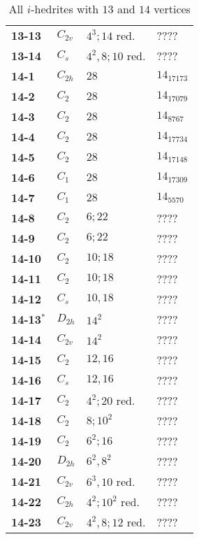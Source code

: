 \documentclass[12pt]{article}
\begin{document}
\begin{table}
\begin{center}
{\begin{minipage}[t]{7cm}
\begin{tabular}{||l|l|l|l||}
{\bf 13-13}	&$C_{2v}$	&$4^3; 14$ red.	&????\\
{\bf 13-14}	&$C_s$	&$4^2,8;10$ red.	&????\\\hline
{\bf 14-1} 	&$C_{2h}$	&$28$		&$14_{17173}$\\
{\bf 14-2}	&$C_{2}$	&$28$		&$14_{17079}$\\
{\bf 14-3}	&$C_2$	&$28$		&$14_{8767}$\\
{\bf 14-4} 	&$C_2$	&$28$		&$14_{17734}$\\
{\bf 14-5} 	&$C_2$	&$28$		&$14_{17148}$\\
{\bf 14-6} 	&$C_1$	&$28$		&$14_{17309}$\\
{\bf 14-7} 	&$C_1$	&$28$		&$14_{5570}$\\
{\bf 14-8}	&$C_{2}$	&$6; 22$		&????\\
{\bf 14-9} 	&$C_2$	&$6; 22$		&????\\
{\bf 14-10}	&$C_2$	&$10; 18$		&????\\
{\bf 14-11}	&$C_2$	&$10; 18$		&????\\
{\bf 14-12}	&$C_s$	&$10, 18$		&????\\
{\bf 14-13${}^{*}$}	&$D_{2h}$	&$14^2$		&????\\
{\bf 14-14}	&$C_{2v}$	&$14^2$		&????\\
{\bf 14-15}	&$C_2$	&$12, 16$		&????\\
{\bf 14-16}	&$C_{s}$	&$12, 16$		&????\\
{\bf 14-17}	&$C_2$	&$4^2; 20$ red.	&????\\
{\bf 14-18}	&$C_2$	&$8; 10^2$	&????\\
{\bf 14-19}	&$C_2$	&$6^2; 16$	&????\\
{\bf 14-20}	&$D_{2h}$	&$6^2, 8^2$	&????\\
{\bf 14-21}	&$C_{2v}$	&$6^3, 10$ red.	&????\\
{\bf 14-22}	&$C_{2h}$	&$4^2; 10^2$ red.	&????\\
{\bf 14-23}	&$C_{2v}$	&$4^2, 8; 12$ red.	&????\\\hline
\end{tabular}
\end{minipage}
}
\end{center}
\caption{All $i$-hedrites with $13$ and $14$ vertices}
\label{tab:i-hedrite13_14}
\end{table}
\end{document}
